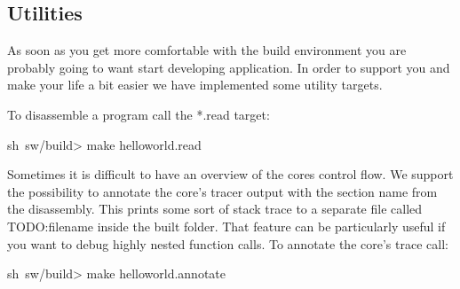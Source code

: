 \subsection{Utilities}

As soon as you get more comfortable with the build environment you are probably going to want start developing application. In order to support you and make your life a bit easier we have implemented some utility targets.

To disassemble a program call the *.read target:

\begin{shellenv}
sh~sw/build> make helloworld.read
\end{shellenv}

Sometimes it is difficult to have an overview of the cores control flow. We support the possibility to annotate the core's tracer output with the section name from the disassembly. This prints some sort of stack trace to a separate file called TODO:filename inside the built folder. That feature can be particularly useful if you want to debug highly nested function calls. To annotate the core's trace call:

\begin{shellenv}
sh~sw/build> make helloworld.annotate
\end{shellenv}



